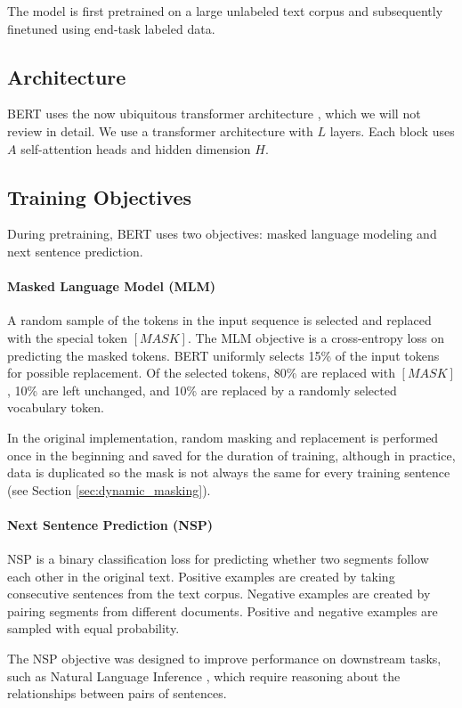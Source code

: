 The model is first pretrained on a large unlabeled text corpus and subsequently finetuned using end-task labeled data.

\subsection{Architecture}
BERT uses the now ubiquitous transformer architecture \cite{vaswani2017attention}, which we will not review in detail. We use a transformer architecture with $L$ layers. Each block uses $A$ self-attention heads and hidden dimension $H$.

\subsection{Training Objectives}

During pretraining, BERT uses two objectives: masked language modeling and next sentence prediction. 

\paragraph{Masked Language Model (MLM)} A random sample of the tokens in the input sequence is selected and replaced with the special token $[\mathit{MASK}]$. The MLM objective is a cross-entropy loss on predicting the masked tokens. BERT uniformly selects 15\% of the input tokens for possible replacement. Of the selected tokens, 80\% are replaced with $[\mathit{MASK}]$, 10\% are left unchanged, and 10\% are replaced by a randomly selected vocabulary token. 

In the original implementation, random masking and replacement is performed once in the beginning and saved for the duration of training, although in practice, data is duplicated so the mask is not always the same for every training sentence (see Section \ref{sec:dynamic_masking}).

\paragraph{Next Sentence Prediction (NSP)} NSP is a binary classification loss for predicting whether two segments follow each other in the original text. Positive examples are created by taking consecutive sentences from the text corpus. Negative examples are created by pairing segments from different documents. Positive and negative examples are sampled with equal probability. 

The NSP objective was designed to improve performance on downstream tasks, such as Natural Language Inference \cite{bowman2015large}, which require reasoning about the relationships between pairs of sentences. 

